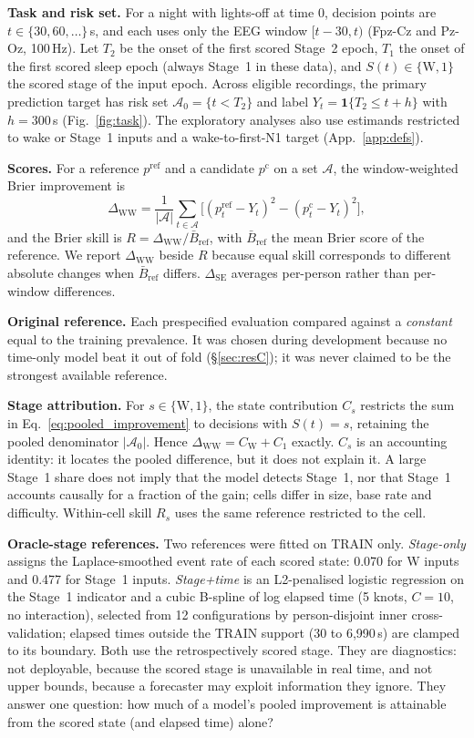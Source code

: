 \documentclass{article}
\newcommand{\R}{\ensuremath{R}}
\newcommand{\dww}{\ensuremath{\Delta_{\mathrm{WW}}}}
\newcommand{\dse}{\ensuremath{\Delta_{\mathrm{SE}}}}
\begin{document}
\textbf{Task and risk set.} For a night with lights-off at time $0$, decision points are $t\in\{30,60,\dots\}$\,s, and each uses only the EEG window $[t-30,t)$ (Fpz-Cz and Pz-Oz, 100\,Hz). Let $T_2$ be the onset of the first scored Stage~2 epoch, $T_1$ the onset of the first scored sleep epoch (always Stage~1 in these data), and $S(t)\in\{\mathrm{W},1\}$ the scored stage of the input epoch. Across eligible recordings, the primary prediction target has risk set $\mathcal{A}_0=\{t<T_2\}$ and label $Y_t=\mathbf{1}\{T_2\le t+h\}$ with $h=300$\,s (Fig.~\ref{fig:task}). The exploratory analyses also use estimands restricted to wake or Stage~1 inputs and a wake-to-first-N1 target (App.~\ref{app:defs}).

\textbf{Scores.} For a reference $p^{\mathrm{ref}}$ and a candidate $p^{\mathrm{c}}$ on a set $\mathcal{A}$, the window-weighted Brier improvement is
\begin{equation}\label{eq:pooled_improvement}
\dww=\frac{1}{|\mathcal{A}|}\sum_{t\in\mathcal{A}}\Big[(p^{\mathrm{ref}}_t-Y_t)^2-(p^{\mathrm{c}}_t-Y_t)^2\Big],
\end{equation}
and the Brier skill is $\R=\dww/\bar B_{\mathrm{ref}}$, with $\bar B_{\mathrm{ref}}$ the mean Brier score of the reference. We report $\dww$ beside $\R$ because equal skill corresponds to different absolute changes when $\bar B_{\mathrm{ref}}$ differs. $\dse$ averages per-person rather than per-window differences.

\textbf{Original reference.} Each prespecified evaluation compared against a \emph{constant} equal to the training prevalence. It was chosen during development because no time-only model beat it out of fold (\S\ref{sec:resC}); it was never claimed to be the strongest available reference.

\textbf{Stage attribution.} For $s\in\{\mathrm{W},1\}$, the state contribution $C_s$ restricts the sum in Eq.~\eqref{eq:pooled_improvement} to decisions with $S(t)=s$, retaining the pooled denominator $|\mathcal{A}_0|$. Hence $\dww=C_{\mathrm{W}}+C_1$ exactly. $C_s$ is an accounting identity: it locates the pooled difference, but it does not explain it. A large Stage~1 share does not imply that the model detects Stage~1, nor that Stage~1 accounts causally for a fraction of the gain; cells differ in size, base rate and difficulty. Within-cell skill $\R_s$ uses the same reference restricted to the cell.

\textbf{Oracle-stage references.} Two references were fitted on TRAIN only. \emph{Stage-only} assigns the Laplace-smoothed event rate of each scored state: 0.070 for W inputs and 0.477 for Stage~1 inputs. \emph{Stage+time} is an L2-penalised logistic regression on the Stage~1 indicator and a cubic B-spline of log elapsed time (5 knots, $C=10$, no interaction), selected from 12 configurations by person-disjoint inner cross-validation; elapsed times outside the TRAIN support (30 to 6{,}990\,s) are clamped to its boundary. Both use the retrospectively scored stage. They are diagnostics: not deployable, because the scored stage is unavailable in real time, and not upper bounds, because a forecaster may exploit information they ignore. They answer one question: how much of a model's pooled improvement is attainable from the scored state (and elapsed time) alone?
\end{document}
